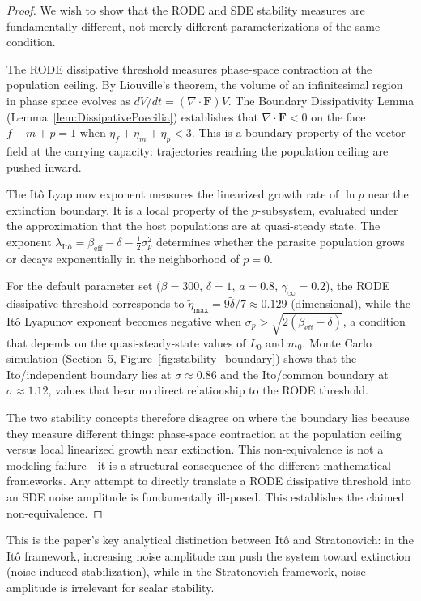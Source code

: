 \documentclass[12pt]{article}
\begin{document}
\begin{proof}
We wish to show that the RODE and SDE stability measures are fundamentally different, not merely different parameterizations of the same condition.

The RODE dissipative threshold measures phase-space contraction at the population ceiling.  By Liouville's theorem, the volume of an infinitesimal region in phase space evolves as $dV/dt = (\nabla \cdot \mathbf{F})V$.  The Boundary Dissipativity Lemma (Lemma~\ref{lem:DissipativePoecilia}) establishes that $\nabla \cdot \mathbf{F} < 0$ on the face $f+m+p=1$ when $\eta_f + \eta_m + \eta_p < 3$.  This is a boundary property of the vector field at the carrying capacity: trajectories reaching the population ceiling are pushed inward.

The It\^{o} Lyapunov exponent measures the linearized growth rate of $\ln p$ near the extinction boundary.  It is a local property of the $p$-subsystem, evaluated under the approximation that the host populations are at quasi-steady state.  The exponent $\lambda_{\text{It\^{o}}} = \beta_{\text{eff}} - \delta - \tfrac{1}{2}\sigma_p^2$ determines whether the parasite population grows or decays exponentially in the neighborhood of $p = 0$.

For the default parameter set ($\beta = 300$, $\delta = 1$, $a = 0.8$, $\gamma_\infty = 0.2$), the RODE dissipative threshold corresponds to $\tilde{\eta}_{\max} = 9\tilde{\delta}/7 \approx 0.129$ (dimensional), while the It\^{o} Lyapunov exponent becomes negative when $\sigma_p > \sqrt{2(\beta_{\text{eff}} - \delta)}$, a condition that depends on the quasi-steady-state values of $L_0$ and $m_0$.  Monte Carlo simulation (Section~5, Figure~\ref{fig:stability_boundary}) shows that the Ito/independent boundary lies at $\sigma \approx 0.86$ and the Ito/common boundary at $\sigma \approx 1.12$, values that bear no direct relationship to the RODE threshold.

The two stability concepts therefore disagree on where the boundary lies because they measure different things: phase-space contraction at the population ceiling versus local linearized growth near extinction.  This non-equivalence is not a modeling failure---it is a structural consequence of the different mathematical frameworks.  Any attempt to directly translate a RODE dissipative threshold into an SDE noise amplitude is fundamentally ill-posed.  This establishes the claimed non-equivalence.
\end{proof}

This is the paper's key analytical distinction between It\^{o} and Stratonovich: in the It\^{o} framework, increasing noise amplitude can push the system toward extinction (noise-induced stabilization), while in the Stratonovich framework, noise amplitude is irrelevant for scalar stability.
\end{document}

